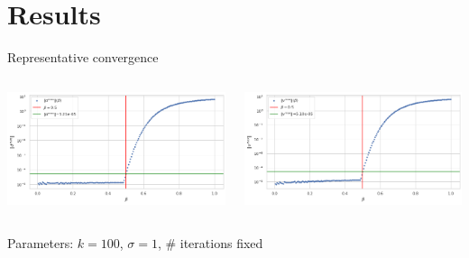 \documentclass{beamer}
\begin{document}
\section{Results}
\begin{frame}{Representative convergence}
	\begin{minipage}[0.95\textheight]{\textwidth}
	\begin{columns}[T]
	\begin{column}{0.50\textwidth}
	\includegraphics[width=\textwidth, keepaspectratio]{../images/d_conv.png}
	\end{column}
	\begin{column}{0.50\textwidth}
	\includegraphics[width=\textwidth, keepaspectratio]{../images/v_conv.png}
	\end{column}
	\end{columns}
	\end{minipage}
	\begin{center}
		Parameters: $k=100$, $\sigma=1$, \# iterations fixed
	\end{center}
\end{frame}
\end{document}
